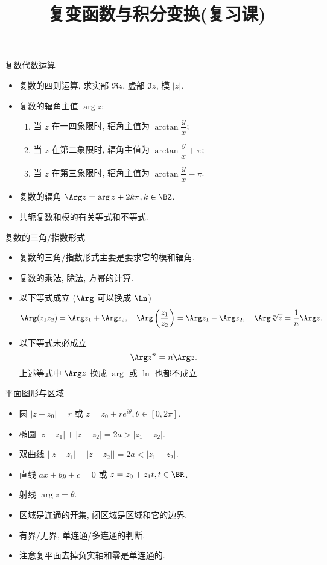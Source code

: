 \documentclass[aspectratio=169,handout]{ctexbeamer}
\title{复变函数与积分变换(复习课)}
\begin{document}
\begin{frame}{复数代数运算}
	\begin{itemize}
		\item 复数的四则运算, 求实部 $\Re z$, 虚部 $\Im z$, 模 $|z|$.
		\item 复数的辐角主值 $\arg z$:
		\begin{enumerate}
			\item 当 $z$ 在一四象限时, 辐角主值为 $\arctan\dfrac yx$;
			\item 当 $z$ 在第二象限时, 辐角主值为 $\arctan\dfrac yx+\pi$;
			\item 当 $z$ 在第三象限时, 辐角主值为 $\arctan\dfrac yx-\pi$.
		\end{enumerate}
		\item 复数的辐角 $\Arg z=\arg z+2k\pi,k\in\BZ$.
		\item 共轭复数和模的有关等式和不等式.
	\end{itemize}
\end{frame}


\begin{frame}{复数的三角/指数形式}
	\begin{itemize}
		\item 复数的三角/指数形式主要是要求它的模和辐角.
		\item 复数的乘法, 除法, 方幂的计算.
		\item 以下等式成立 ($\Arg$ 可以换成 $\Ln$)
		\[
			\Arg (z_1z_2)=\Arg z_1+\Arg z_2,\quad 
			\Arg\left(\frac{z_1}{z_2}\right)=\Arg z_1-\Arg z_2,\quad
			\Arg\sqrt[n]{z}=\frac1n\Arg z.
		\]
		\item 以下等式未必成立
		\[
			\Arg z^n=n\Arg z.
		\]
		上述等式中 $\Arg z$ 换成 $\arg$ 或 $\ln$ 也都不成立.
	\end{itemize}
\end{frame}


\begin{frame}{平面图形与区域}
	\begin{itemize}
		\item 圆 $|z-z_0|=r$ 或 $z=z_0+re^{i\theta},\theta\in[0,2\pi]$.
		\item 椭圆 $|z-z_1|+|z-z_2|=2a>|z_1-z_2|$.
		\item 双曲线 $\bigl||z-z_1|-|z-z_2|\bigr|=2a<|z_1-z_2|$.
		\item 直线 $ax+by+c=0$ 或 $z=z_0+z_1t,t\in\BR$.
		\item 射线 $\arg z=\theta$.
		\item 区域是连通的开集, 闭区域是区域和它的边界.
		\item 有界/无界, 单连通/多连通的判断.
		\item 注意复平面去掉负实轴和零是单连通的.
	\end{itemize}
\end{frame}
\end{document}
